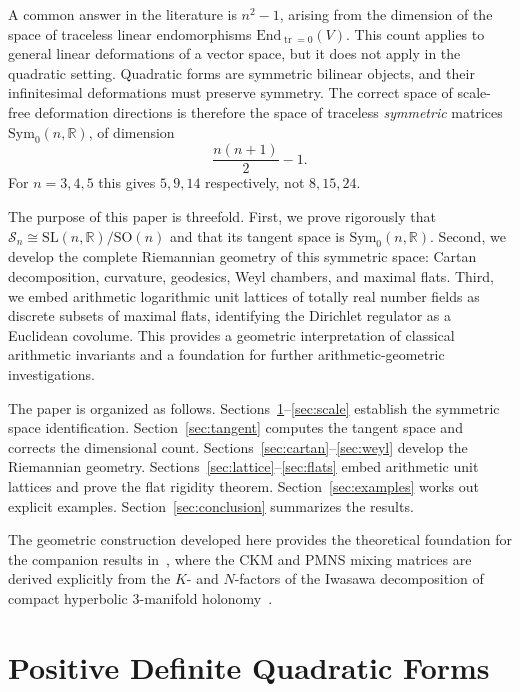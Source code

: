 \documentclass[12pt]{article}
\theoremstyle{definition}
\theoremstyle{remark}
\newcommand{\R}{\mathbb{R}}
\newcommand{\SL}{\mathrm{SL}}
\newcommand{\SO}{\mathrm{SO}}
\newcommand{\Symz}{\mathrm{Sym}_{0}}
\newcommand{\calM}{\mathcal{S}}
\newcommand{\tr}{\operatorname{tr}}
\begin{document}
A common answer in the literature is $n^2 - 1$, arising from the
dimension of the space of traceless linear endomorphisms
$\mathrm{End}_{\tr=0}(V)$.
This count applies to general linear deformations of a vector
space, but it does not apply in the quadratic setting.
Quadratic forms are symmetric bilinear objects, and their infinitesimal
deformations must preserve symmetry.
The correct space of scale-free deformation directions is therefore
the space of traceless \emph{symmetric} matrices $\Symz(n,\R)$, of
dimension
\[
  \frac{n(n+1)}{2} - 1.
\]
For $n = 3, 4, 5$ this gives $5, 9, 14$ respectively, not $8, 15, 24$.

The purpose of this paper is threefold.
First, we prove rigorously that $\calM_n \cong \SL(n,\R)/\SO(n)$
and that its tangent space is $\Symz(n,\R)$.
Second, we develop the complete Riemannian geometry of this symmetric
space: Cartan decomposition, curvature, geodesics, Weyl chambers, and
maximal flats.
Third, we embed arithmetic logarithmic unit lattices of totally real
number fields as discrete subsets of maximal flats, identifying the
Dirichlet regulator as a Euclidean covolume.
This provides a geometric interpretation of classical arithmetic
invariants and a foundation for further arithmetic-geometric
investigations.

The paper is organized as follows.
Sections~\ref{sec:forms}--\ref{sec:scale} establish the symmetric
space identification.
Section~\ref{sec:tangent} computes the tangent space and corrects
the dimensional count.
Sections~\ref{sec:cartan}--\ref{sec:weyl} develop the Riemannian
geometry.
Sections~\ref{sec:lattice}--\ref{sec:flats} embed arithmetic unit
lattices and prove the flat rigidity theorem.
Section~\ref{sec:examples} works out explicit examples.
Section~\ref{sec:conclusion} summarizes the results.

The geometric construction developed here provides the theoretical
foundation for the companion results in~\cite{Gentry:CKM,Gentry:PMNS},
where the CKM and PMNS mixing matrices are derived explicitly from the
$K$- and $N$-factors of the Iwasawa decomposition of compact hyperbolic
3-manifold holonomy~\cite{Gentry:CKM,Gentry:PMNS}.

\section{Positive Definite Quadratic Forms}
\label{sec:forms}
\end{document}
